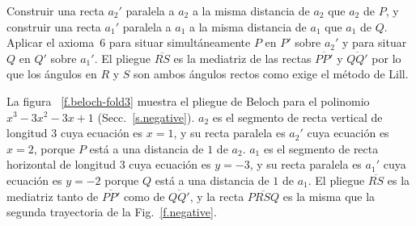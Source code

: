 Construir una recta $a_2'$ paralela a $a_2$ a la misma distancia de $a_2$ que $a_2$ de $P$, y construir una recta $a_1'$ paralela a $a_1$ a la misma distancia de $a_1$ que $a_1$ de $Q$. Aplicar el axioma~6 para situar simultáneamente $P$ en $P'$ sobre $a_2'$ y para situar $Q$ en $Q'$ sobre $a_1'$. El pliegue $\overline{RS}$ es la mediatriz de las rectas $\overline{PP'}$ y $\overline{QQ'}$ por lo que los ángulos en $R$ y $S$ son ambos ángulos rectos como exige el método de Lill.

La figura ~\ref{f.beloch-fold3} muestra el pliegue de Beloch para el polinomio $x^3-3x^2-3x+1$ (Secc.~\ref{s.negative}). $a_2$ es el segmento de recta vertical de longitud $3$ cuya ecuación es $x=1$, y su recta paralela es $a_2'$ cuya ecuación es $x=2$, porque $P$ está a una distancia de $1$ de $a_2$. $a_1$ es el segmento de recta horizontal de longitud $3$ cuya ecuación es $y=-3$, y su recta paralela es $a_1'$ cuya ecuación es $y=-2$ porque $Q$ está a una distancia de $1$ de $a_1$. El pliegue $\overline{RS}$ es la mediatriz tanto de $\overline{PP'}$ como de $\overline{QQ'}$, y la recta $\overline{PRSQ}$ es la misma que la segunda trayectoria de la Fig.~\ref{f.negative}.

